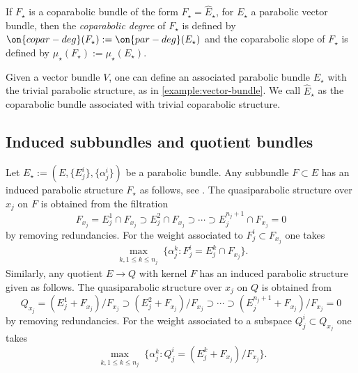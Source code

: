 \begin{definition}
\notready
	\label{definition:}
	If $F_\star$ is a coparabolic bundle of the form $F_\star = \widehat{E}_\star$,
for $E_\star$ a parabolic vector bundle, then the {\em coparabolic degree} of
$F_\star$ is defined by $\on{copar-deg}(F_\star) := \on{par-deg}(E_\star)$ and the
coparabolic slope of $F_\star$ is defined by $\mu_\star(F_\star) := \mu_\star(E_\star)$.
\end{definition}
\begin{example}
\notready
	\label{example:vector-bundle-co}
	Given a vector bundle $V$, one can define an associated parabolic bundle
	$E_\star$ with the trivial parabolic structure, as in
	\autoref{example:vector-bundle}. We call $\widehat{E}_\star$
	as the coparabolic bundle associated with trivial coparabolic structure.
\end{example}



\subsection{Induced subbundles and quotient bundles}

\label{subsubsection:induced-subbundle}
Let $E_\star := (E, \{E^i_j\}, \{\alpha^i_j\})$ be a parabolic bundle.
	Any subbundle $F \subset E$ has an induced parabolic structure $F_\star$ as
	follows, see
\cite[Part 3, \S1.A, Definition 4]{seshadri:fibres-vectoriels-sur-les-courbes-algebriques}.
	The quasiparabolic structure over $x_j$ on $F$ is obtained
	from the filtration $$F_{x_j} = E^1_j \cap F_{x_j} \supset E^2_j \cap
	F_{x_j} \supset \cdots \supset E^{n_j+1}_j \cap F_{x_j} = 0$$
	by removing redundancies. For the weight associated to $F^i_j \subset
	F_{x_j}$ one takes $$\max_{\substack{k, 1 \leq k \leq n_j}} \{ \alpha^k_j : F^i_j = E^k_j \cap
	F_{x_j}\}.$$
	Similarly, any quotient $E \to Q$ with kernel $F$ has an induced parabolic structure
	given as follows.
	The quasiparabolic structure over $x_j$ on $Q$ is obtained from
	$$Q_{x_j} = (E^1_j+F_{x_j})/F_{x_j} \supset (E^2_j+F_{x_j})/F_{x_j}\supset\cdots\supset
	(E^{n_j+1}_j+F_{x_j})/F_{x_j} = 0$$
	by removing redundancies. For the weight associated to a subspace $Q^i_j \subset
Q_{x_j}$ one takes $$\max_{\substack{k, 1 \leq k \leq n_j}} \{ \alpha^k_j : Q^i_j = (E^k_j + F_{x_j})
/F_{x_j}\}.$$

